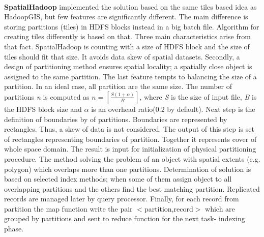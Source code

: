 \documentclass[a4paper,12pt,oneside]{report}
\begin{document}
\paragraph*{} \textbf{SpatialHadoop} implemented the solution  based on the same tiles based idea as HadoopGIS, but few features 
are significantly different.
The main difference is storing partitions (tiles) in HDFS blocks instead in a big batch file. Algorithm for creating tiles differently 
is  based on that. Three main characteristics arise from that fact. SpatialHadoop is counting 
with a size of HDFS block and the size of tiles should fit  that size. It avoids data skew of spatial datasets. 
Secondly, a design of partitioning method ensures spatial locality; a spatially close object is assigned to the same 
partition. The last feature tempts to balancing the size of a partition. In an ideal case, all partition are the 
same size. The number of partitions \emph{n} is computed as $n=\left[ \frac{S(1+ \alpha)}{B}\right]$,
 where \emph{S} is the size of input file, \emph{B} is the HDFS block size and $\alpha$ is an overhead ratio(0.2 by default). 
 Next step is the definition of boundaries by of partitions. Boundaries are represented by rectangles. Thus, a skew of data is not considered. 
 The output of this step is set of rectangles representing  boundaries of partition. Together it represents cover 
 of whole space domain. The result is input for initialization of physical partitioning procedure. The method solving 
 the problem of an object with spatial extents (e.g. polygon) which overlaps more than one partitions. Determination 
 of solution is based on selected index methods; when some of them assign object to all overlapping partitions and 
 the others find the best matching partition. Replicated records are managed later by  query processor. Finally, 
 for each record from partition the map function write the pair $<$partition,record$>$ which are grouped by 
 partitions and sent to reduce function for the next task- indexing phase.
\end{document}
